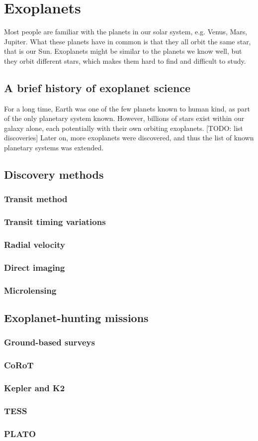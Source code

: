 
\section{Exoplanets}

Most people are familiar with the planets in our solar system, e.g. Venus, Mars, Jupiter. What these planets have in common is that they all orbit the same star, that is our Sun. Exoplanets might be similar to the planets we know well, but they orbit different stars, which makes them hard to find and difficult to study.

\subsection{A brief history of exoplanet science}
For a long time, Earth was one of the few planets known to human kind, as part of the only planetary system known. However, billions of stars exist within our galaxy alone, each potentially with their own orbiting exoplanets. [TODO: list discoveries] Later on, more exoplanets were discovered, and thus the list of known planetary systems was extended. 


\subsection{Discovery methods}
\red{[TODO]}
\subsubsection{Transit method}
\red{[TODO]}
\subsubsection{Transit timing variations}
\red{[TODO]}
\subsubsection{Radial velocity}
\red{[TODO]}
\subsubsection{Direct imaging}
\red{[TODO]}
\subsubsection{Microlensing}
\red{[TODO]}

\subsection{Exoplanet-hunting missions}
\red{[TODO]}
\subsubsection{Ground-based surveys}
\red{[TODO]}
\subsubsection{CoRoT}
\red{[TODO]}
\subsubsection{Kepler and K2}
\red{[TODO]}
\subsubsection{TESS}
\red{[TODO]}
\subsubsection{PLATO}
\red{[TODO]}